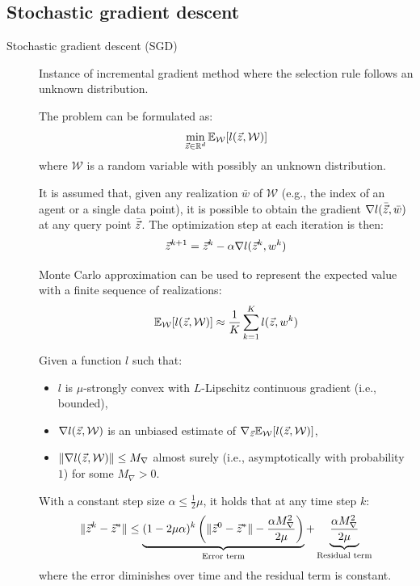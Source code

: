 \subsection{Stochastic gradient descent}

\begin{description}
    \item[Stochastic gradient descent (SGD)] 
        Instance of incremental gradient method where the selection rule follows an unknown distribution.

        The problem can be formulated as:
        \[ \min_{{\vec{z}} \in \mathbb{R}^d} \mathbb{E}_\mathcal{W}[l({\vec{z}}, \mathcal{W})] \]
        where $\mathcal{W}$ is a random variable with possibly an unknown distribution.

        It is assumed that, given any realization $\bar{w}$ of $\mathcal{W}$ (e.g., the index of an agent or a single data point), it is possible to obtain the gradient $\nabla l(\bar{{\vec{z}}}, \bar{w})$ at any query point $\bar{{\vec{z}}}$. The optimization step at each iteration is then:
        \[ {\vec{z}}^{k+1} = {\vec{z}}^k - \alpha \nabla l({\vec{z}}^k, w^k) \]
        
        \begin{remark}
            Monte Carlo approximation can be used to represent the expected value with a finite sequence of realizations:
            \[ \mathbb{E}_\mathcal{W}[l({\vec{z}}, \mathcal{W})] \approx \frac{1}{K} \sum_{k=1}^{K} l({\vec{z}}, w^k) \]
        \end{remark}

        \begin{theorem} 
            Given a function $l$ such that:
            \begin{itemize}
                \item $l$ is $\mu$-strongly convex with $L$-Lipschitz continuous gradient (i.e., bounded),
                \item $\nabla l({\vec{z}}, \mathcal{W})$ is an unbiased estimate of $\nabla_{\vec{z}} \mathbb{E}_\mathcal{W}[l({\vec{z}}, \mathcal{W})]$,
                \item $\Vert \nabla l({\vec{z}}, \mathcal{W}) \Vert \leq M_\nabla$ almost surely (i.e., asymptotically with probability $1$) for some $M_\nabla > 0$.
            \end{itemize}
            With a constant step size $\alpha \leq \frac{1}{2}\mu$, it holds that at any time step $k$:
            \[ 
                \Vert {\vec{z}}^k - {\vec{z}}^* \Vert \leq 
                \underbrace{(1-2\mu\alpha)^k \left( \Vert {\vec{z}}^0 - {\vec{z}}^* \Vert - \frac{\alpha M_\nabla^2}{2\mu} \right)}_{\text{Error term}} + 
                \underbrace{\frac{\alpha M_\nabla^2}{2\mu}}_{\text{Residual term}} \]
            where the error diminishes over time and the residual term is constant.
        \end{theorem}


\end{description}
